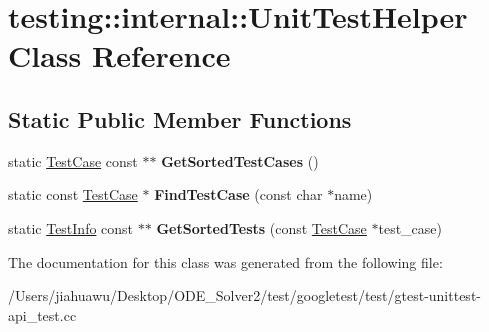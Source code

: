 \hypertarget{classtesting_1_1internal_1_1_unit_test_helper}{}\section{testing\+:\+:internal\+:\+:Unit\+Test\+Helper Class Reference}
\label{classtesting_1_1internal_1_1_unit_test_helper}
\subsection*{Static Public Member Functions}
\begin{DoxyCompactItemize}
\item 
\mbox{\label{classtesting_1_1internal_1_1_unit_test_helper_a9a549307062083d10358638af272cc98}} 
static \mbox{\hyperlink{classtesting_1_1_test_case}{Test\+Case}} const  $\ast$$\ast$ {\bfseries Get\+Sorted\+Test\+Cases} ()
\item 
\mbox{\label{classtesting_1_1internal_1_1_unit_test_helper_a46303cbb7a6abb456f7b1350542113ac}} 
static const \mbox{\hyperlink{classtesting_1_1_test_case}{Test\+Case}} $\ast$ {\bfseries Find\+Test\+Case} (const char $\ast$name)
\item 
\mbox{\label{classtesting_1_1internal_1_1_unit_test_helper_a02602d22fb74566dad78c0c9d4f24e78}} 
static \mbox{\hyperlink{classtesting_1_1_test_info}{Test\+Info}} const  $\ast$$\ast$ {\bfseries Get\+Sorted\+Tests} (const \mbox{\hyperlink{classtesting_1_1_test_case}{Test\+Case}} $\ast$test\+\_\+case)
\end{DoxyCompactItemize}


The documentation for this class was generated from the following file\+:\begin{DoxyCompactItemize}
\item 
/\+Users/jiahuawu/\+Desktop/\+O\+D\+E\+\_\+\+Solver2/test/googletest/test/gtest-\/unittest-\/api\+\_\+test.\+cc\end{DoxyCompactItemize}
